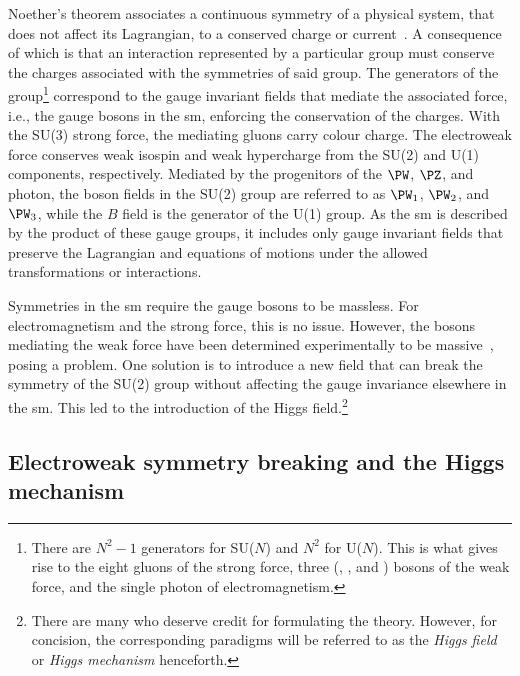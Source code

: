 Noether's theorem associates a continuous symmetry of a physical system, that does not affect its Lagrangian, to a conserved charge or current~\cite{Noether_1971}. A consequence of which is that an interaction represented by a particular group must conserve the charges associated with the symmetries of said group. The generators of the group\footnote{There are $N^2 - \text{1}$ generators for SU($N$) and $N^2$ for U($N$). This is what gives rise to the eight gluons of the strong force, three (\PWplus, \PWminus, and \PZ) bosons of the weak force, and the single photon of electromagnetism.} correspond to the gauge invariant fields that mediate the associated force, i.e., the gauge bosons in the \acrshort{sm}, enforcing the conservation of the charges. With the SU(3) strong force, the mediating gluons carry colour charge. The electroweak force conserves weak isospin and weak hypercharge from the SU(2) and U(1) components, respectively. Mediated by the progenitors of the $\PW$, $\PZ$, and photon, the boson fields in the SU(2) group are referred to as $\PW_1$, $\PW_2$, and $\PW_3$, while the $B$ field is the generator of the U(1) group. As the \acrshort{sm} is described by the product of these gauge groups, it includes only gauge invariant fields that preserve the Lagrangian and equations of motions under the allowed transformations or interactions.

Symmetries in the \acrlong{sm} require the gauge bosons to be massless. For electromagnetism and the strong force, this is no issue. However, the bosons mediating the weak force have been determined experimentally to be massive~\cite{Arnison:1983mk,Bagnaia:1983zx}, posing a problem. One solution is to introduce a new field that can break the symmetry of the SU(2) group without affecting the gauge invariance elsewhere in the \acrshort{sm}. This led to the introduction of the Higgs field.\footnote{There are many who deserve credit for formulating the theory. However, for concision, the corresponding paradigms will be referred to as the \emph{Higgs field} or \emph{Higgs mechanism} henceforth.}





\subsection{Electroweak symmetry breaking and the Higgs mechanism}
\label{subsec:theory_higgs_mechanism}


